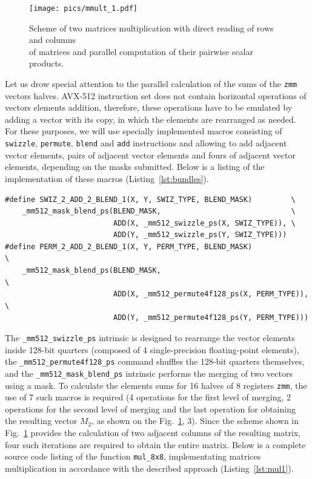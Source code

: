 \documentclass[
11pt,%
tightenlines,%
twoside,%
onecolumn,%
nofloats,%
nobibnotes,%
nofootinbib,%
superscriptaddress,%
noshowpacs,%
centertags]%
{revtex4}
\begin{document}
\begin{figure}[h]
\setcaptionmargin{5mm}
\onelinecaptionsfalse %
\texttt{[image: pics/mmult\_1.pdf]}
\caption{Scheme of two matrices multiplication with direct reading of rows and columns \\ of matrices and parallel computation of their pairwise scalar products.}\label{fig:mmult_1}
\end{figure}

Let us drow special attention to the parallel calculation of the sums of the \texttt{zmm} vectors halves.
AVX-512 instruction set does not contain horizontal operations of vectors elements addition, therefore, these operations have to be emulated by adding a vector with its copy, in which the elements are rearranged as needed.
For these purposes, we will use specially implemented macros consisting of \texttt{swizzle}, \texttt{permute}, \texttt{blend} and \texttt{add} instructions and allowing to add adjacent vector elements, pairs of adjacent vector elements and fours of adjacent vector elements, depending on the masks submitted.
Below is a listing of the implementation of these macros (Listing~\ref{lst:bundles}).

\begin{lstlisting}[caption={Macros that implement bundles from operations \texttt{swizzle}, \texttt{permute}, \texttt{blend}.},label={lst:bundles}]
#define SWIZ_2_ADD_2_BLEND_1(X, Y, SWIZ_TYPE, BLEND_MASK)         \
    _mm512_mask_blend_ps(BLEND_MASK,                              \
                         ADD(X, _mm512_swizzle_ps(X, SWIZ_TYPE)), \
                         ADD(Y, _mm512_swizzle_ps(Y, SWIZ_TYPE)))
#define PERM_2_ADD_2_BLEND_1(X, Y, PERM_TYPE, BLEND_MASK)              \
    _mm512_mask_blend_ps(BLEND_MASK,                                   \
                         ADD(X, _mm512_permute4f128_ps(X, PERM_TYPE)), \
                         ADD(Y, _mm512_permute4f128_ps(Y, PERM_TYPE)))
\end{lstlisting}

The \texttt{\_mm512\_swizzle\_ps} intrinsic is designed to rearrange the vector elements inside 128-bit quarters (composed of 4 single-precision floating-point elements), the \texttt{\_mm512\_permute4f128\_ps} command shuffles the 128-bit quarters themselves, and the \texttt{\_mm512\_mask\_blend\_ps} intrinsic performs the merging of two vectors using a mask.
To calculate the elements sums for 16 halves of 8 registers \texttt{zmm}, the use of 7 such macros is required (4 operations for the first level of merging, 2 operations for the second level of merging and the last operation for obtaining the resulting vector $M_2$, as shown on the Fig.~\ref{fig:mmult_1}, 3).
Since the scheme shown in Fig.~\ref{fig:mmult_1} provides the calculation of two adjacent columns of the resulting matrix, four such iterations are required to obtain the entire matrix.
Below is a complete source code listing of the function \texttt{mul\_8x8}, implementating matrices multiplication in accordance with the described approach (Listing~\ref{lst:mul1}).
\end{document}
